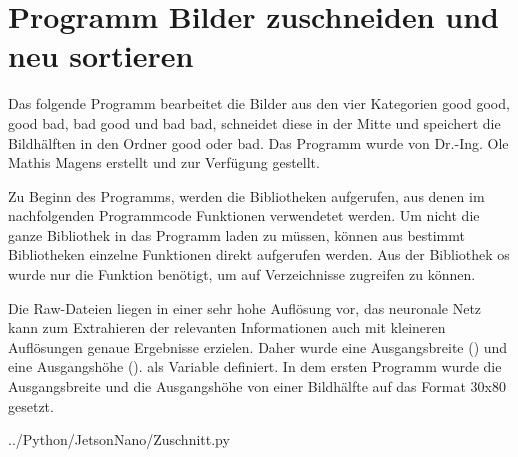 \section{Programm Bilder zuschneiden und neu sortieren}


Das folgende Programm bearbeitet die Bilder aus den vier Kategorien good good, good bad,
bad good und bad bad, schneidet diese in der Mitte und speichert die Bildhälften in den
Ordner good oder bad. Das Programm wurde von Dr.-Ing. Ole Mathis Magens erstellt
und zur Verfügung gestellt.



Zu Beginn des Programms, werden die Bibliotheken aufgerufen, aus denen im nachfolgenden 
Programmcode Funktionen verwendetet werden. Um nicht die ganze Bibliothek in
das Programm laden zu müssen, können aus bestimmt Bibliotheken einzelne Funktionen
direkt aufgerufen werden. Aus der Bibliothek os wurde nur die Funktion  benötigt,
um auf Verzeichnisse zugreifen zu können.

Die Raw-Dateien liegen in einer sehr hohe Auflösung vor, das neuronale Netz kann zum Extrahieren 
der relevanten Informationen auch mit kleineren Auflösungen genaue Ergebnisse
erzielen. Daher wurde eine Ausgangsbreite () und eine Ausgangshöhe 
(). als Variable definiert. In dem ersten Programm wurde die Ausgangsbreite 
und die Ausgangshöhe von einer Bildhälfte auf das Format 30x80 gesetzt.

{../Python/JetsonNano/Zuschnitt.py}

